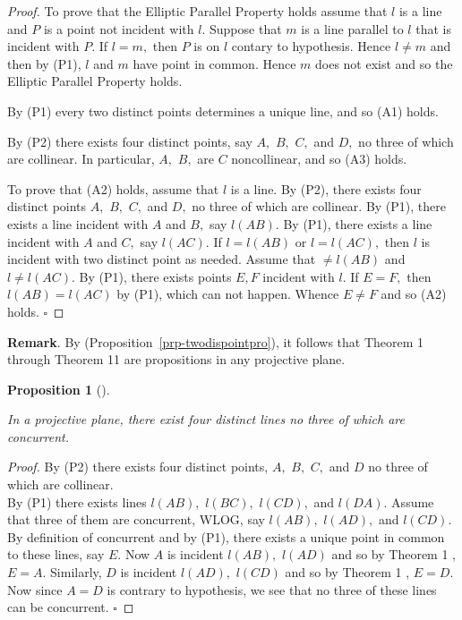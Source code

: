 \documentclass[
  twoside,
  12pt,
  letterpaper,
  fleqn]{article}
\theoremstyle{definition}
\theoremstyle{definition}
\theoremstyle{plain}
\newtheorem{proposition}{Proposition}[section]
\theoremstyle{plain}
\theoremstyle{remark}
\begin{document}
\begin{proof}

To prove that the Elliptic Parallel Property holds assume that \(l\) is
a line and \(P\) is a point not incident with \(l.\) Suppose that \(m\)
is a line parallel to \(l\) that is incident with \(P.\) If \(l=m,\)
then \(P\) is on \(l\) contary to hypothesis. Hence \(l\neq m\) and then
by (P1), \(l\) and \(m\) have point in common. Hence \(m\) does not
exist and so the Elliptic Parallel Property holds.

By (P1) every two distinct points determines a unique line, and so (A1)
holds.

By (P2) there exists four distinct points, say \(A,\) \(B,\) \(C,\) and
\(D,\) no three of which are collinear. In particular, \(A,\) \(B,\) are
\(C\) noncollinear, and so (A3) holds.

To prove that (A2) holds, assume that \(l\) is a line. By (P2), there
exists four distinct points \(A,\) \(B,\) \(C,\) and \(D,\) no three of
which are collinear. By (P1), there exists a line incident with \(A\)
and \(B,\) say \(l(AB).\) By (P1), there exists a line incident with
\(A\) and \(C,\) say \(l(AC).\) If \(l=l(AB)\) or \(l=l(AC),\) then
\(l\) is incident with two distinct point as needed. Assume that
\(\neq l(AB)\) and \(l\neq l(AC).\) By (P1), there exists points
\(E, F\) incident with \(l.\) If \(E=F,\) then \(l(AB)=l(AC)\) by (P1),
which can not happen. Whence \(E\neq F\) and so (A2) holds. \(\square\)

\end{proof}

\textbf{Remark}. By (Proposition~\ref{prp-twodispointpro}), it follows
that Theorem 1 through Theorem 11 are propositions in any projective
plane.

\begin{proposition}[]\protect\hypertarget{prp-threecon}{}\label{prp-threecon}

In a projective plane, there exist four distinct lines no three of which
are concurrent.

\end{proposition}

\begin{proof}

By (P2) there exists four distinct points, \(A,\) \(B,\) \(C,\) and
\(D\) no three of which are collinear.\\
By (P1) there exists lines \(l(AB),\) \(l(BC),\) \(l(CD),\) and
\(l(DA).\) Assume that three of them are concurrent, WLOG, say
\(l(AB),\) \(l(AD),\) and \(l(CD).\) By definition of concurrent and by
(P1), there exists a unique point in common to these lines, say \(E.\)
Now \(A\) is incident \(l(AB),\) \(l(AD)\) and so by Theorem 1 ,
\(E=A.\) Similarly, \(D\) is incident \(l(AD),\) \(l(CD)\) and so by
Theorem 1 , \(E=D.\) Now since \(A=D\) is contrary to hypothesis, we see
that no three of these lines can be concurrent. \(\square\)

\end{proof}
\end{document}
